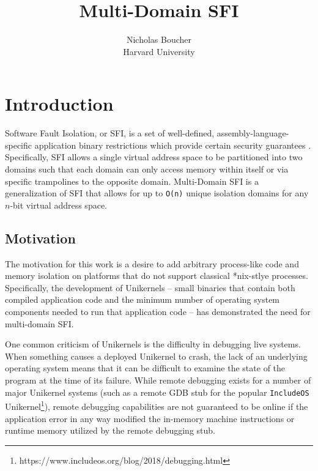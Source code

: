 \documentclass[12pt]{article}
\begin{document}
 
\title{Multi-Domain SFI}
\author{Nicholas Boucher \\ Harvard University}

\maketitle

\section{Introduction}

Software Fault Isolation, or SFI, is a set of well-defined, assembly-language-specific application binary restrictions which provide certain security guarantees \cite{wahbe_efficient_1993}. Specifically, SFI allows a single virtual address space to be partitioned into two domains such that each domain can only access memory within itself or via specific trampolines to the opposite domain. Multi-Domain SFI is a generalization of SFI that allows for up to \texttt{O(n)} unique isolation domains for any $n$-bit virtual address space.

\subsection{Motivation}

The motivation for this work is a desire to add arbitrary process-like code and memory isolation on platforms that do not support classical *nix-stlye processes. Specifically, the development of Unikernels -- small binaries that contain both compiled application code and the minimum number of operating system components needed to run that application code \cite{madhavapeddy_unikernels:_2013} -- has demonstrated the need for multi-domain SFI.

One common criticism of Unikernels is the difficulty in debugging live systems. When something causes a deployed Unikernel to crash, the lack of an underlying operating system means that it can be difficult to examine the state of the program at the time of its failure. While remote debugging exists for a number of major Unikernel systems (such as a remote GDB stub for the popular \texttt{IncludeOS} \cite{a._bratterud_includeos:_2015} Unikernel\footnote{https://www.includeos.org/blog/2018/debugging.html}), remote debugging capabilities are not guaranteed to be online if the application error in any way modified the in-memory machine instructions or runtime memory utilized by the remote debugging stub.
\end{document}
